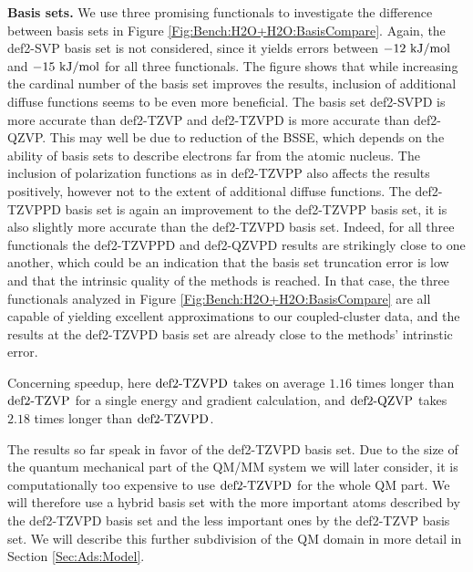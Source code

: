 \textbf{Basis sets.} We use three promising functionals to investigate the difference
between basis sets in Figure \ref{Fig:Bench:H2O+H2O:BasisCompare}. Again, the
def2-SVP basis set is not considered, since it yields errors between $-12\ \text {kJ/mol}$ and $-15\ \text {kJ/mol}$ for all three
functionals. The figure shows that while increasing the cardinal number of the
basis set improves the results, inclusion of additional diffuse functions seems to
be even more beneficial. The basis set def2-SVPD is more accurate than def2-TZVP and
def2-TZVPD is more accurate than def2-QZVP.
This may well be due to reduction of the BSSE, which depends on the ability
of basis sets to describe electrons far from the atomic nucleus.
The inclusion of polarization functions as in def2-TZVPP also
affects the results positively, however not to the extent of additional
diffuse functions. The def2-TZVPPD basis set is again an improvement
to the def2-TZVPP basis set, it is also slightly more accurate than the
def2-TZVPD basis set. Indeed, for all three functionals the def2-TZVPPD and
def2-QZVPD results are strikingly close to one another, which could
be an indication that the basis set truncation error is low and that
the intrinsic quality of the methods is reached. In that case, the
three functionals analyzed in Figure \ref{Fig:Bench:H2O+H2O:BasisCompare} are
all capable of yielding excellent approximations to our coupled-cluster data,
and the results at the def2-TZVPD basis set are already close to the
methods' intrinstic error.  

Concerning speedup, here $\text{def2-TZVPD}$ takes on average $1.16$ times longer than
$\text{def2-TZVP}$ for a single energy and gradient calculation, and $\text{def2-QZVP}$ takes $2.18$
times longer than $\text{def2-TZVPD}$.

The results so far speak in favor of the def2-TZVPD basis set. Due 
to the size of the quantum mechanical part of the QM/MM system we will later consider,
it is computationally too expensive to use $\text{def2-TZVPD}$ for the whole
QM part. We will therefore use a hybrid basis set with the more important atoms
described by the def2-TZVPD basis set and the less important ones by the
def2-TZVP basis set. We will describe this further subdivision of the QM domain
in more detail in Section \ref{Sec:Ads:Model}.

